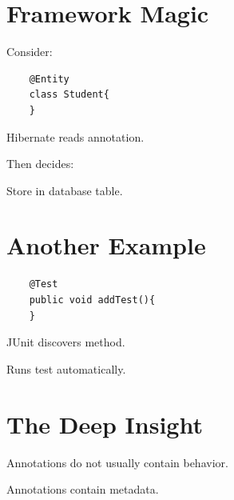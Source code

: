 \documentclass[11pt,a4paper]{book}
\begin{document}
\section{Framework Magic}

Consider:

\begin{verbatim} 
    @Entity
    class Student{
    }
\end{verbatim}


Hibernate reads annotation.


Then decides:


Store in database table.


\section{Another Example}

\begin{verbatim} 
    @Test
    public void addTest(){
    }
\end{verbatim}


JUnit discovers method.


Runs test automatically.


\section{The Deep Insight}

Annotations do not usually
contain behavior.


Annotations contain metadata.

\end{document}

